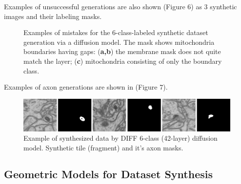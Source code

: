 \documentclass[journal,article,submit,pdftex,moreauthors]{Definitions/mdpi}
\begin{document}
Examples of unsuccessful generations are also shown (Figure 6) as 3 synthetic images and their labeling masks.

\begin{figure}[H]
	\hspace{0.2cm}
	\hspace{0.2cm}
	\hspace{0.2cm}
	\caption{Examples of mistakes for the 6-class-labeled synthetic dataset generation via a diffusion
	model. The mask shows mitochondria boundaries having gaps: (\textbf{a,b}) the membrane mask does not quite match the layer; (\textbf{c}) mitochondria consisting of only the boundary class.\label{fig6}}
\end{figure}

Examples of axon generations are shown in (Figure 7).

\begin{figure}[H]
	\includegraphics[width=13cm]{Definitions/figure-7.png}
	\caption{Example of synthesized data by DIFF 6-class (42-layer) diffusion model. Synthetic tile
	(fragment) and it’s axon masks.}
\end{figure}

\subsection{Geometric Models for Dataset Synthesis}
\end{document}
